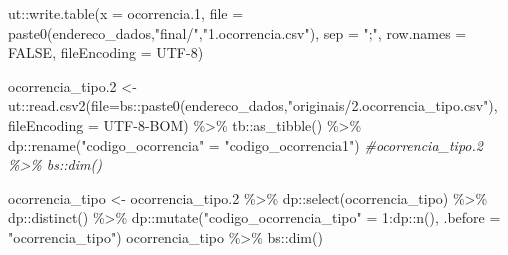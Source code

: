 \documentclass[
]{article}
\newenvironment{Shaded}{\begin{snugshade}}{\end{snugshade}}
\newcommand{\AttributeTok}[1]{\textcolor[rgb]{0.77,0.63,0.00}{#1}}
\newcommand{\CommentTok}[1]{\textcolor[rgb]{0.56,0.35,0.01}{\textit{#1}}}
\newcommand{\ConstantTok}[1]{\textcolor[rgb]{0.00,0.00,0.00}{#1}}
\newcommand{\DecValTok}[1]{\textcolor[rgb]{0.00,0.00,0.81}{#1}}
\newcommand{\FloatTok}[1]{\textcolor[rgb]{0.00,0.00,0.81}{#1}}
\newcommand{\FunctionTok}[1]{\textcolor[rgb]{0.00,0.00,0.00}{#1}}
\newcommand{\NormalTok}[1]{#1}
\newcommand{\OtherTok}[1]{\textcolor[rgb]{0.56,0.35,0.01}{#1}}
\newcommand{\SpecialCharTok}[1]{\textcolor[rgb]{0.00,0.00,0.00}{#1}}
\newcommand{\StringTok}[1]{\textcolor[rgb]{0.31,0.60,0.02}{#1}}
\begin{document}
\begin{Shaded}
\begin{Highlighting}[]
\NormalTok{ut}\SpecialCharTok{::}\FunctionTok{write.table}\NormalTok{(}\AttributeTok{x =}\NormalTok{ ocorrencia}\FloatTok{.1}\NormalTok{,}
            \AttributeTok{file =} \FunctionTok{paste0}\NormalTok{(endereco\_dados,}\StringTok{"final/"}\NormalTok{,}\StringTok{"1.ocorrencia.csv"}\NormalTok{),}
            \AttributeTok{sep =} \StringTok{";"}\NormalTok{,}
            \AttributeTok{row.names =} \ConstantTok{FALSE}\NormalTok{,}
            \AttributeTok{fileEncoding =} \StringTok{\textquotesingle{}UTF{-}8\textquotesingle{}}\NormalTok{)}
\end{Highlighting}
\end{Shaded}

\begin{Shaded}
\begin{Highlighting}[]
\NormalTok{ocorrencia\_tipo}\FloatTok{.2} \OtherTok{\textless{}{-}}\NormalTok{ ut}\SpecialCharTok{::}\FunctionTok{read.csv2}\NormalTok{(}\AttributeTok{file=}\NormalTok{bs}\SpecialCharTok{::}\FunctionTok{paste0}\NormalTok{(endereco\_dados,}\StringTok{"originais/2.ocorrencia\_tipo.csv"}\NormalTok{),}
                               \AttributeTok{fileEncoding =} \StringTok{\textquotesingle{}UTF{-}8{-}BOM\textquotesingle{}}\NormalTok{) }\SpecialCharTok{\%\textgreater{}\%} 
\NormalTok{                tb}\SpecialCharTok{::}\FunctionTok{as\_tibble}\NormalTok{() }\SpecialCharTok{\%\textgreater{}\%}\NormalTok{ dp}\SpecialCharTok{::}\FunctionTok{rename}\NormalTok{(}\StringTok{"codigo\_ocorrencia"} \OtherTok{=} \StringTok{"codigo\_ocorrencia1"}\NormalTok{)}
\CommentTok{\#ocorrencia\_tipo.2 \%\textgreater{}\% bs::dim()}


\NormalTok{ocorrencia\_tipo }\OtherTok{\textless{}{-}}\NormalTok{ ocorrencia\_tipo}\FloatTok{.2} \SpecialCharTok{\%\textgreater{}\%}
\NormalTok{                    dp}\SpecialCharTok{::}\FunctionTok{select}\NormalTok{(}\StringTok{\textquotesingle{}ocorrencia\_tipo\textquotesingle{}}\NormalTok{) }\SpecialCharTok{\%\textgreater{}\%}
\NormalTok{                    dp}\SpecialCharTok{::}\FunctionTok{distinct}\NormalTok{() }\SpecialCharTok{\%\textgreater{}\%}
\NormalTok{                    dp}\SpecialCharTok{::}\FunctionTok{mutate}\NormalTok{(}\StringTok{"codigo\_ocorrencia\_tipo"} \OtherTok{=} \DecValTok{1}\SpecialCharTok{:}\NormalTok{dp}\SpecialCharTok{::}\FunctionTok{n}\NormalTok{(),}
                                  \AttributeTok{.before =} \StringTok{"ocorrencia\_tipo"}\NormalTok{)}
\NormalTok{ocorrencia\_tipo }\SpecialCharTok{\%\textgreater{}\%}\NormalTok{ bs}\SpecialCharTok{::}\FunctionTok{dim}\NormalTok{()}
\end{Highlighting}
\end{Shaded}
\end{document}
